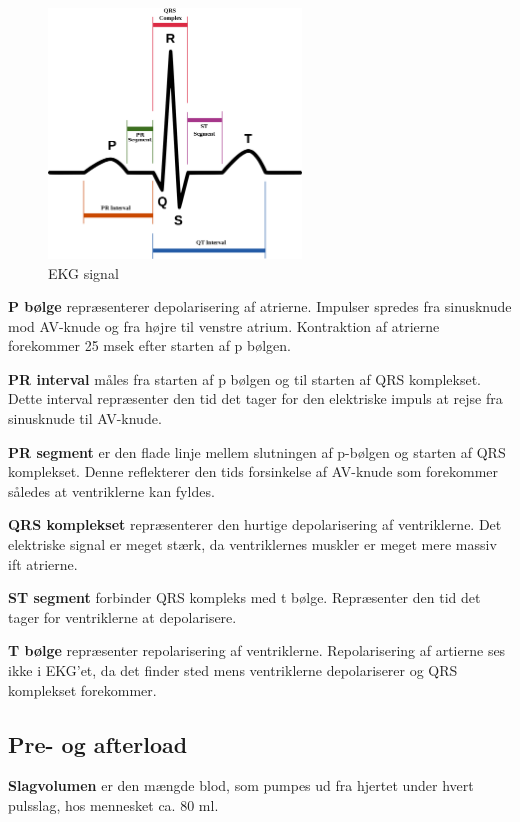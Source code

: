 \begin{figure}[H]
\centering
  \includegraphics[width=0.6\textwidth]{Billeder/pqrst.png}
   \caption{EKG signal} 
   \label{fig:pqrst}
\end{figure}

\textbf{P bølge} repræsenterer depolarisering af atrierne. Impulser spredes fra sinusknude mod AV-knude og fra højre til venstre atrium. Kontraktion af atrierne forekommer 25 msek efter starten af p bølgen.

\textbf{PR interval} måles fra starten af p bølgen og til starten af QRS komplekset. Dette interval repræsenter den tid det tager for den elektriske impuls at rejse fra sinusknude til AV-knude.

\textbf{PR segment} er den flade linje mellem slutningen af p-bølgen og starten af QRS komplekset. Denne reflekterer den tids forsinkelse af AV-knude som forekommer således at ventriklerne kan fyldes.  

\textbf{QRS komplekset} repræsenterer den hurtige depolarisering af ventriklerne. Det elektriske signal er meget stærk, da ventriklernes muskler er meget mere massiv ift atrierne. 

\textbf{ST segment} forbinder QRS kompleks med t bølge. Repræsenter den tid det tager for ventriklerne at depolarisere.

\textbf{T bølge} repræsenter repolarisering af ventriklerne. Repolarisering af artierne ses ikke i EKG'et, da det finder sted mens ventriklerne depolariserer og QRS komplekset forekommer. 

\subsection{Pre- og afterload}

\textbf{Slagvolumen} er den mængde blod, som pumpes ud fra hjertet under hvert pulsslag, hos mennesket ca. 80 ml.

